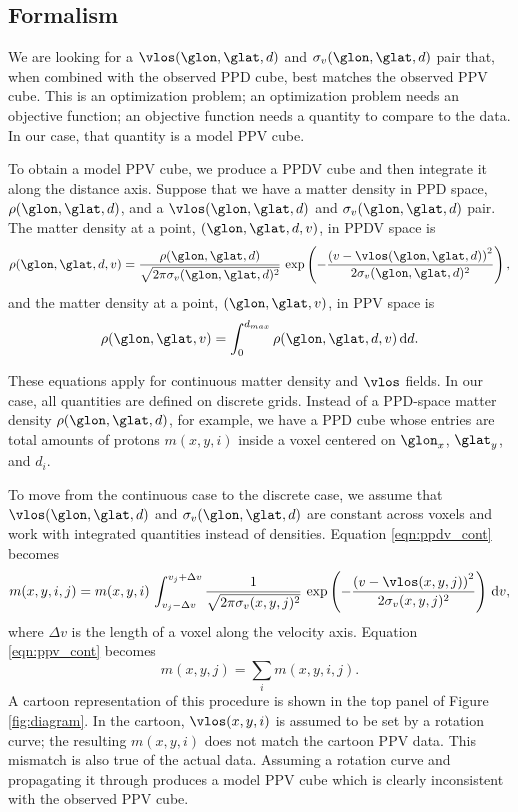 \subsection{Formalism}
\label{sec:KT-method}
We are looking for a $\vlos(\glon, \glat, d)$ and $\sigma_v(\glon, \glat, d)$ pair that, when combined with the observed PPD cube, best matches the observed PPV cube. 
This is an optimization problem; an optimization problem needs an objective function; an objective function needs a quantity to compare to the data. 
In our case, that quantity is a model PPV cube.

To obtain a model PPV cube, we produce a PPDV cube and then integrate it along the distance axis. 
Suppose that we have a matter density in PPD space, $\rho(\glon, \glat, d)$, and a $\vlos(\glon, \glat, d)$ and $\sigma_v(\glon, \glat, d)$ pair. 
The matter density at a point, $(\glon, \glat, d, v)$, in PPDV space is 
\begin{equation}
 \label{eqn:ppdv_cont}
  \rho(\glon, \glat, d, v) = \frac{\rho(\glon, \glat, d)}{\sqrt{2 \pi \sigma_v(\glon, \glat, d)^2}} 
   \, \exp\left(- \frac{\left( v - \vlos(\glon, \glat, d) \right)^2}{2 \sigma_v(\glon, \glat, d)^2} \right),
\end{equation}
and the matter density at a point, $(\glon, \glat, v)$, in PPV space is
\begin{equation}
  \label{eqn:ppv_cont}
  \rho(\glon, \glat, v) = \int_0^{d_{max}} \rho(\glon, \glat, d, v) \, {\rm d}d.
\end{equation}

These equations apply for continuous matter density and $\vlos$ fields.
In our case, all quantities are defined on discrete grids. 
Instead of a PPD-space matter density $\rho(\glon, \glat, d)$, for example, we have a PPD cube whose entries are total amounts of protons $m(x, y, i)$ inside a voxel centered on $\glon_x$, $\glat_y$, and $d_i$.

To move from the continuous case to the discrete case, we assume that $\vlos(\glon, \glat, d)$ and $\sigma_v(\glon, \glat, d)$ are constant across voxels and work with integrated quantities instead of densities. 
Equation \ref{eqn:ppdv_cont} becomes
\begin{equation}
  \label{eqn:ppdv_disc}
  m(x, y, i, j) = m(x, y, i) \, \int_{v_j - \Delta v}^{v_j + \Delta v} 
 \frac{1}{\sqrt{2 \pi \sigma_v(x, y, j)^2}} \,
    \exp\left(- \frac{\left( v - \vlos(x, y, j) \right)^2}{2 \sigma_v(x, y, j)^2} \right)\, {\rm d}v,
\end{equation}
where $\Delta v$ is the length of a voxel along the velocity axis.
Equation \ref{eqn:ppv_cont} becomes
\begin{equation}
  \label{eqn:ppv_disc}
  m(x, y, j) = \sum_{i} m(x, y, i, j).
\end{equation}
A cartoon representation of this procedure is shown in the top panel of Figure \ref{fig:diagram}.
In the cartoon, $\vlos(x, y, i)$ is assumed to be set by a rotation curve; the resulting $m(x, y, i)$ does not match the cartoon PPV data.
This mismatch is also true of the actual data.
Assuming a rotation curve and propagating it through produces a model PPV cube which is clearly inconsistent with the observed PPV cube. 

